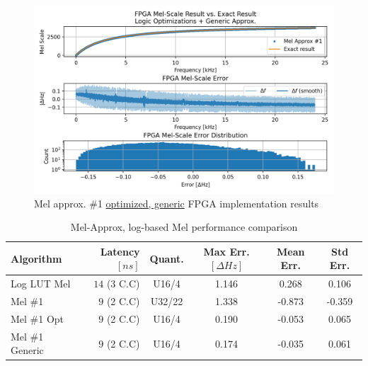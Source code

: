 \begin{figure}[H]
    \centering
    \includegraphics[width=\linewidth]{Scaling/images/mel_approx_logic_opt_generic}
    \caption{Mel approx. \#1 \underline{optimized, generic} FPGA implementation results}\label{fig:mel_approx_logic_opt_generic}
\end{figure}


\begin{table}[H]
    \hspace*{-1.8cm}
\begin{tabular}{ !{\color{mtblborder}\vrule}l!{\color{mtblborder}\vrule}rcccc| } 
    \hline

    \hline
     \color{white}\bf{Algorithm} 
    & \color{white}\bf{Latency \([ns]\)}  
    & \color{white}\bf{Quant.} 
    & \color{white}\bf{Max Err. \([\Delta Hz]\)}
    & \color{white}\bf{Mean Err.}
    & \color{white}\bf{Std Err.} \\
    \hline

    \hline
     Log LUT Mel   & \(14\) (3 C.C) & U16/4 & 1.146 & 0.268 & 0.106 \\
    \hline
    
    \hline
     Mel \#1   & \(9\) (2 C.C) &  U32/22  & 1.338 & -0.873 & -0.359 \\
    \hline
    
    \hline
     Mel \#1 Opt      & \(9\) (2 C.C) &  U16/4  & 0.190 & -0.053 & 0.065 \\
    \hline

    \hline
     Mel \#1 Generic     & \(9\) (2 C.C) &  U16/4  & \color{gtblcaption}0.174 & \color{gtblcaption}-0.035 & \color{gtblcaption}0.061 \\
    \hline

    \hline
\end{tabular}
\caption{Mel-Approx, log-based Mel performance comparison}
\label{tbl:mel_scale_performance}
\end{table}


